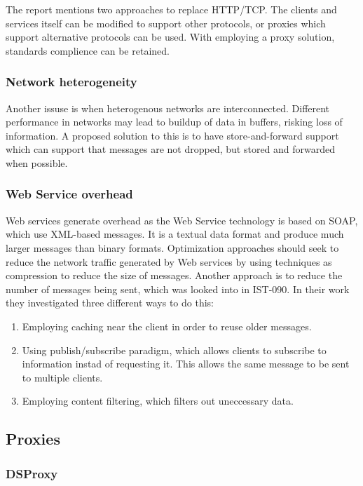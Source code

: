 \documentclass[USenglish]{ifimaster}
\begin{document}
The report mentions two approaches to replace HTTP/TCP. The clients and services
itself can be modified to support other protocols, or proxies which support
alternative protocols can be used. With employing a proxy solution, standards
complience can be retained.


\subsubsection{Network heterogeneity}

Another issuse is when heterogenous networks are interconnected. Different
performance in networks may lead to buildup of data in buffers, risking loss of
information. A proposed solution to this is to have store-and-forward support
which can support that messages are not dropped, but stored and forwarded when
possible.


\subsubsection{Web Service overhead}

Web services generate overhead as the Web Service technology is based on SOAP,
which use XML-based messages. It is a textual data format and produce much
larger messages than binary formats. Optimization approaches should seek to
reduce the network traffic generated by Web services by using techniques as
compression to reduce the size of messages. Another approach is to reduce the
number of messages being sent, which was looked into in IST-090\cite{IST-090}. In
their work they investigated three different ways to do this:

\begin{enumerate}
    \item Employing caching near the client in order to reuse older messages.
    \item Using publish/subscribe paradigm, which allows clients to subscribe to
    information instad of requesting it. This allows the same message to be sent
    to multiple clients.
    \item Employing content filtering, which filters out uneccessary data.
\end{enumerate}

\subsection{Proxies}


\subsubsection{DSProxy}
\end{document}
